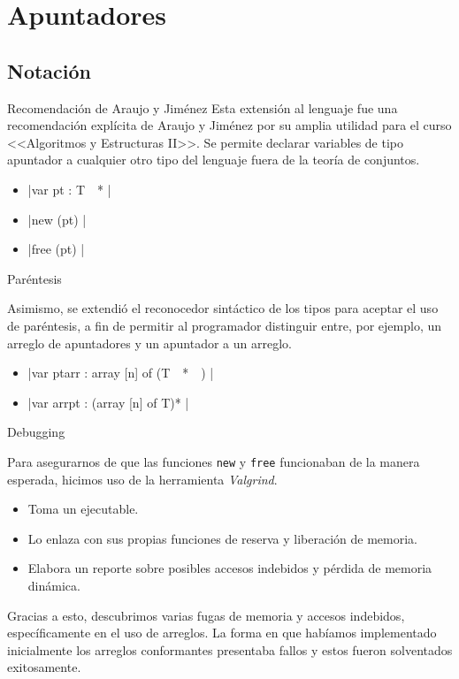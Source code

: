 \section{Apuntadores}

\subsection*{Notación}

\begin{frame}{Recomendación de Araujo y Jiménez}
Esta extensión al lenguaje fue una recomendación explícita de Araujo y Jiménez
por su amplia utilidad para el curso <<Algoritmos y Estructuras II>>. Se permite
declarar variables de tipo apuntador a cualquier otro tipo del lenguaje fuera 
de la teoría de conjuntos.

\begin{itemize}
  \item{ \ingra|var pt : T~~* | }
  \item{ \ingra|new  (pt) | }
  \item{ \ingra|free (pt) | }
\end{itemize}
\end{frame}

\begin{frame}{Paréntesis}

Asimismo, se extendió el reconocedor sintáctico de los tipos para aceptar el 
uso de paréntesis, a fin de permitir al programador distinguir entre, por 
ejemplo, un arreglo de apuntadores y un apuntador a un arreglo.

\begin{itemize}
  \item{ \ingra|var ptarr : array [n] of (T~~*~~) | }
  \item{ \ingra|var arrpt : (array [n] of T)* | }
\end{itemize}
\end{frame}

\begin{frame}{Debugging}

Para asegurarnos de que las funciones \texttt{new} y \texttt{free} funcionaban
de la manera esperada, hicimos uso de la herramienta \textit{Valgrind}. 
\begin{itemize}
  \item Toma un ejecutable.
  \item Lo enlaza con sus propias funciones de reserva y liberación de memoria.
  \item Elabora un reporte sobre posibles accesos indebidos y pérdida de memoria 
    dinámica.
\end{itemize}

Gracias a esto, descubrimos varias fugas de memoria y accesos indebidos, específicamente
en el uso de arreglos. La forma en que habíamos implementado inicialmente los arreglos conformantes presentaba fallos y estos fueron solventados exitosamente.
\end{frame}

